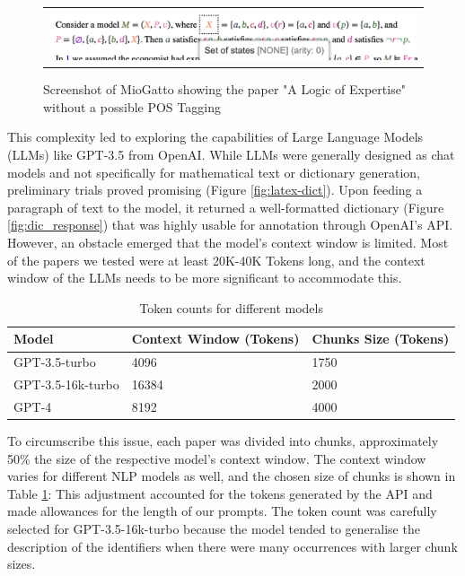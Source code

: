\begin{figure}[htpb]
  \centering
  \begin{tabular}{c}
  \includegraphics[width=14cm]{images/POS_failed.png}
  \end{tabular}
  \caption[POS Tagging Left]{Screenshot of MioGatto showing the paper "A Logic of Expertise" without a possible POS Tagging}\label{fig:POS_failed}
\end{figure}

This complexity led to exploring the capabilities of Large Language Models (LLMs) like GPT-3.5 from OpenAI. While LLMs were generally designed as chat models and not specifically for mathematical text or dictionary generation, preliminary trials proved promising (Figure \ref{fig:latex-dict}). Upon feeding a paragraph of text to the model, it returned a well-formatted dictionary (Figure \ref{fig:dic_response}) that was highly usable for annotation through OpenAI's API. However, an obstacle emerged that the model's context window is limited. Most of the papers we tested were at least 20K-40K Tokens long, and the context window of the LLMs needs to be more significant to accommodate this.

\begin{table}[h]
    \centering
    \begin{tabular}{lll}
        \hline
        Model & Context Window (Tokens) & Chunks Size (Tokens)\\
        \hline
        GPT-3.5-turbo & 4096 & 1750 \\
        GPT-3.5-16k-turbo & 16384 & 2000 \\
        GPT-4 & 8192 & 4000 \\
        \hline
    \end{tabular}
    \caption{Token counts for different models}
    \label{tab:token_counts}
\end{table}

To circumscribe this issue, each paper was divided into chunks, approximately 50\% the size of the respective model's context window. The context window varies for different \ac{NLP} models as well, and the chosen size of chunks is shown in Table \ref{tab:token_counts}: This adjustment accounted for the tokens generated by the API and made allowances for the length of our prompts. The token count was carefully selected for GPT-3.5-16k-turbo because the model tended to generalise the description of the identifiers when there were many occurrences with larger chunk sizes.

